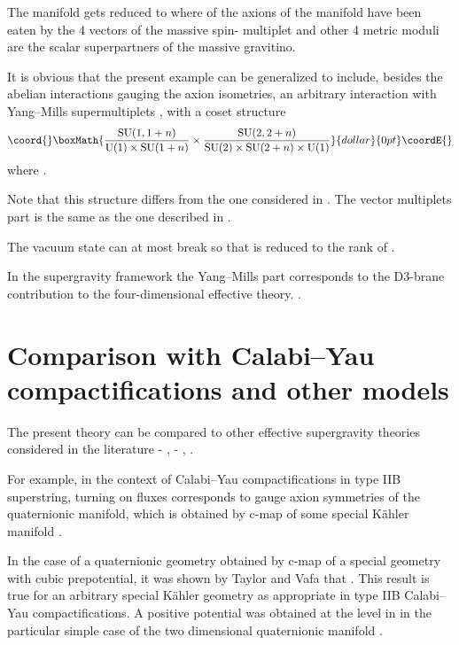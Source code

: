 \documentclass[a4paper,12pt]{article}
\begin{document}
The \coordHE{}  manifold \coordHE{} gets reduced to 
\coordHE{}
where \coordHE{} of the \coordHE{} axions of the \coordHE{} manifold have been eaten by the 4 vectors of the massive spin-\coordHE{} multiplet
and other 4 metric moduli are the scalar superpartners of the massive gravitino.

It is obvious that the present example can be generalized to include, besides the abelian interactions 
gauging the axion isometries, an arbitrary interaction with \coordHE{} Yang--Mills supermultiplets \cite{grana,fm}, 
with a coset structure \cite{fp2,dflv}
$$\coord{}\boxMath{\frac {\rSU(1,1+n)}{\rU(1)\times \rSU(1+n)}\times \frac {\rSU(2,2+n)}{\rSU(2)\times \rSU(2+n) \times \rU(1)}}{dollar}{0pt}\coordE{}$$
where \coordHE{}.

Note that this structure differs from the one considered in \cite{fgpt}. The vector multiplets part is the same as the one 
described in \cite{zino}.

The vacuum state can at most break \coordHE{} so that \coordHE{} is reduced to the rank of \coordHE{}.

In the supergravity framework the Yang--Mills part corresponds to the D3-brane contribution
to the four-dimensional effective theory. \cite{fp1,kst,grana,fm}.

\section{Comparison with Calabi--Yau compactifications and other models}

The present theory can be compared to other effective 
\coordHE{} supergravity theories  considered in the literature \cite{tv} - \cite{louis}, \cite{lm} - \cite{hl}, \cite{bbhl,agata,bd}.

For example, in the context of Calabi--Yau compactifications in type IIB superstring, turning on fluxes corresponds 
to gauge axion symmetries of the quaternionic manifold, which is obtained by c-map \cite{cfg} of  
some special K\"ahler manifold \cite{mic,agata}.

In the case of a quaternionic geometry obtained by c-map of a special geometry with cubic prepotential,
 it was shown by Taylor and Vafa \cite{tv} that \coordHE{}.
This result is true for an arbitrary special K\"ahler geometry
as appropriate in type IIB Calabi--Yau compactifications.
A positive potential was obtained at the \coordHE{} level in \cite{agata}
in the particular simple case of the two dimensional quaternionic manifold \coordHE{}.
\end{document}
